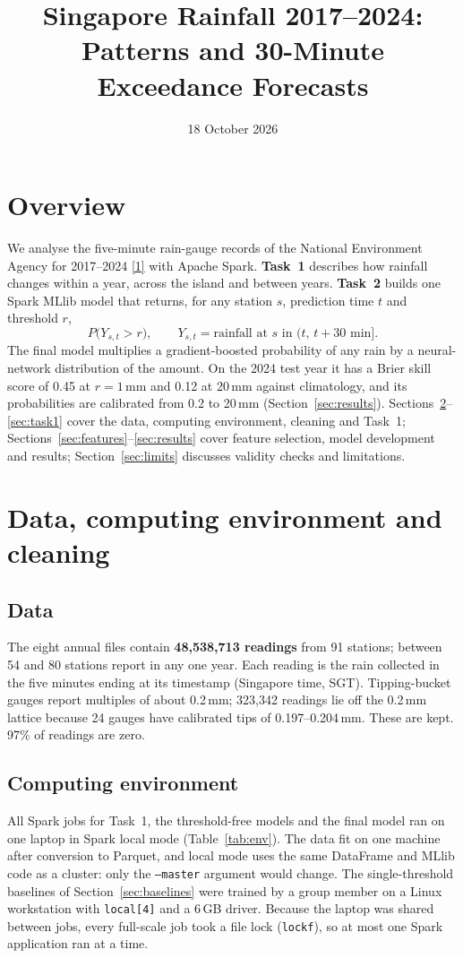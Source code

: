 \documentclass[lang=en,11pt,a4paper,bibend=bibtex]{elegantpaper}
\title{Singapore Rainfall 2017--2024:\\Patterns and 30-Minute Exceedance Forecasts}
\author{\memberA\qquad \memberB}
\institute{DSA5208 Project 2, National University of Singapore}
\date{18 October 2026}
\newcommand{\mm}{\,mm}
\begin{document}
\maketitle
\vspace{0.3em}

\section{Overview}
We analyse the five-minute rain-gauge records of the National Environment Agency for 2017--2024 \hyperref[ref:1]{[1]} with Apache Spark. \textbf{Task~1} describes how rainfall changes within a year, across the island and between years. \textbf{Task~2} builds one Spark MLlib model that returns, for any station $s$, prediction time $t$ and threshold $r$,
\[
P\big(Y_{s,t} > r\big),\qquad Y_{s,t} = \text{rainfall at } s \text{ in } (t,\,t+30\text{ min}].
\]
The final model multiplies a gradient-boosted probability of any rain by a neural-network distribution of the amount. On the 2024 test year it has a Brier skill score of 0.45 at $r=1$\mm{} and 0.12 at 20\mm{} against climatology, and its probabilities are calibrated from 0.2 to 20\mm{} (Section~\ref{sec:results}). Sections~\ref{sec:data}--\ref{sec:task1} cover the data, computing environment, cleaning and Task~1; Sections~\ref{sec:features}--\ref{sec:results} cover feature selection, model development and results; Section~\ref{sec:limits} discusses validity checks and limitations.

\section{Data, computing environment and cleaning}\label{sec:data}
\subsection{Data}
The eight annual files contain \textbf{48,538,713 readings} from 91 stations; between 54 and 80 stations report in any one year. Each reading is the rain collected in the five minutes ending at its timestamp (Singapore time, SGT). Tipping-bucket gauges report multiples of about 0.2\mm{}; 323,342 readings lie off the 0.2\mm{} lattice because 24 gauges have calibrated tips of 0.197--0.204\mm. These are kept. 97\% of readings are zero.

\subsection{Computing environment}
All Spark jobs for Task~1, the threshold-free models and the final model ran on one laptop in Spark local mode (Table~\ref{tab:env}). The data fit on one machine after conversion to Parquet, and local mode uses the same DataFrame and MLlib code as a cluster: only the \texttt{--master} argument would change. The single-threshold baselines of Section~\ref{sec:baselines} were trained by a group member on a Linux workstation with \texttt{local[4]} and a 6\,GB driver. Because the laptop was shared between jobs, every full-scale job took a file lock (\texttt{lockf}), so at most one Spark application ran at a time.
\end{document}
